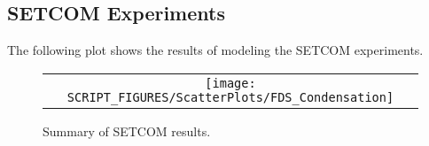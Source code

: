 \subsection{SETCOM Experiments}
The following plot shows the results of modeling the SETCOM experiments.

\begin{figure}[h!]
	\begin{center}
		\begin{tabular}{c}
			\texttt{[image: SCRIPT\_FIGURES/ScatterPlots/FDS\_Condensation]}
		\end{tabular}
	\end{center}
	\caption[Summary of SETCOM results]{Summary of SETCOM results.}
	\label{SETCOM_summary}
\end{figure}

